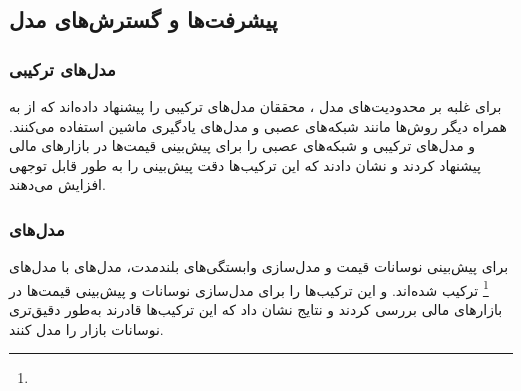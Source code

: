 {\subsection{پیشرفت‌ها و گسترش‌های مدل }

\subsubsection{مدل‌های ترکیبی }
برای غلبه بر محدودیت‌های مدل ، محققان مدل‌های ترکیبی را پیشنهاد داده‌اند که از  به همراه دیگر روش‌ها مانند شبکه‌های عصبی و مدل‌های یادگیری ماشین استفاده می‌کنند. \cite{armstrong2001forecasting} و \cite{zhang2005forecasting} مدل‌های ترکیبی  و شبکه‌های عصبی را برای پیش‌بینی قیمت‌ها در بازارهای مالی پیشنهاد کردند و نشان دادند که این ترکیب‌ها دقت پیش‌بینی را به طور قابل توجهی افزایش می‌دهند.

\subsubsection{مدل‌های }

برای پیش‌بینی نوسانات قیمت و مدل‌سازی وابستگی‌های بلندمدت، مدل‌های  با مدل‌های \footnote{} ترکیب شده‌اند. \cite{engle1982autogressive} و \cite{bollerslev1986generalized} این ترکیب‌ها را برای مدل‌سازی نوسانات و پیش‌بینی قیمت‌ها در بازارهای مالی بررسی کردند و نتایج نشان داد که این ترکیب‌ها قادرند به‌طور دقیق‌تری نوسانات بازار را مدل کنند.



}
